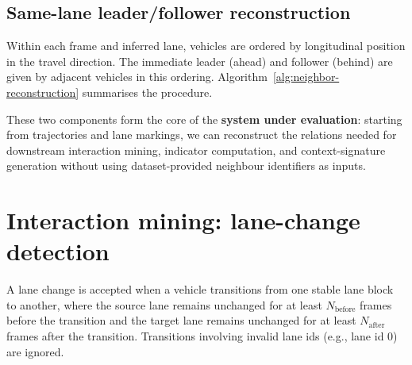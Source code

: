 \documentclass[12pt,a4paper,twoside,openright]{report}
\begin{document}
    \subsection{Same-lane leader/follower reconstruction}
    Within each frame and inferred lane, vehicles are ordered by longitudinal position in the travel direction. The immediate leader (ahead) and follower (behind) are given by adjacent vehicles in this ordering. Algorithm~\ref{alg:neighbor-reconstruction} summarises the procedure.

    \begin{algorithm}[t]
\caption{Same-lane leader/follower reconstruction from geometry}
\label{alg:neighbor-reconstruction}

    \end{algorithm}

    These two components form the core of the \textbf{system under evaluation}: starting from trajectories and lane markings, we can reconstruct the relations needed for downstream interaction mining, indicator computation, and context-signature generation without using dataset-provided neighbour identifiers as inputs.


    \section{Interaction mining: lane-change detection}
    A lane change is accepted when a vehicle transitions from one stable lane block to another, where the source lane remains unchanged for at least $N_\text{before}$ frames before the transition and the target lane remains unchanged for at least $N_\text{after}$ frames after the transition. Transitions involving invalid lane ids (e.g., lane id 0) are ignored.
\end{document}
